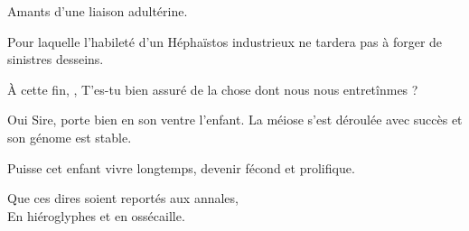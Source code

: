 \begin{drama}
  \alexasspeaks Amants d’une liaison adultérine.

  \elenaspeaks Pour laquelle l’habileté d’un Héphaïstos industrieux ne tardera pas à forger de sinistres desseins.

               À cette fin, \alexas, T’es-tu bien assuré de la chose dont nous nous entretînmes ?
  
  \alexasspeaks Oui Sire, \catin{} porte bien en son ventre l’enfant. La méiose s’est déroulée avec succès et son génome est stable.

  \elenaspeaks Puisse cet enfant vivre longtemps, devenir fécond et prolifique.

  \alexasspeaks
  \begin{minipage}[t]{\linewidth}
    Que ces dires soient reportés aux annales,\\
    En hiéroglyphes et en ossécaille.
  \end{minipage}
\end{drama}

\scene


\StageDirII{\reine, \princesse}



